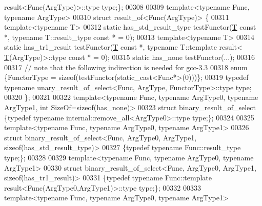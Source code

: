 \begin{DoxyCode}
      result<Func(ArgType)>::type type;\};
00308 
00309 \textcolor{keyword}{template}<\textcolor{keyword}{typename} Func, \textcolor{keyword}{typename} ArgType>
00310 \textcolor{keyword}{struct }result\_of<Func(ArgType)> \{
00311     \textcolor{keyword}{template}<\textcolor{keyword}{typename} T>
00312     \textcolor{keyword}{static} has\_std\_result\_type    testFunctor(\hyperlink{group___sparse_core___module_class_eigen_1_1_triplet}{T} \textcolor{keyword}{const} *, \textcolor{keyword}{typename} T::result\_type \textcolor{keyword}{const} * = 0);
00313     \textcolor{keyword}{template}<\textcolor{keyword}{typename} T>
00314     \textcolor{keyword}{static} has\_tr1\_result         testFunctor(\hyperlink{group___sparse_core___module_class_eigen_1_1_triplet}{T} \textcolor{keyword}{const} *, \textcolor{keyword}{typename} T::template result<
      \hyperlink{group___sparse_core___module_class_eigen_1_1_triplet}{T}(ArgType)>::type \textcolor{keyword}{const} * = 0);
00315     \textcolor{keyword}{static} has\_none               testFunctor(...);
00316 
00317     \textcolor{comment}{// note that the following indirection is needed for gcc-3.3}
00318     \textcolor{keyword}{enum} \{FunctorType = \textcolor{keyword}{sizeof}(testFunctor(static\_cast<Func*>(0)))\};
00319     \textcolor{keyword}{typedef} \textcolor{keyword}{typename} unary\_result\_of\_select<Func, ArgType, FunctorType>::type type;
00320 \};
00321 
00322 \textcolor{keyword}{template}<\textcolor{keyword}{typename} Func, \textcolor{keyword}{typename} ArgType0, \textcolor{keyword}{typename} ArgType1, \textcolor{keywordtype}{int} SizeOf=sizeof(has\_none)>
00323 \textcolor{keyword}{struct }binary\_result\_of\_select \{\textcolor{keyword}{typedef} \textcolor{keyword}{typename} internal::remove\_all<ArgType0>::type type;\};
00324 
00325 \textcolor{keyword}{template}<\textcolor{keyword}{typename} Func, \textcolor{keyword}{typename} ArgType0, \textcolor{keyword}{typename} ArgType1>
00326 \textcolor{keyword}{struct }binary\_result\_of\_select<Func, ArgType0, ArgType1, sizeof(has\_std\_result\_type)>
00327 \{\textcolor{keyword}{typedef} \textcolor{keyword}{typename} Func::result\_type type;\};
00328 
00329 \textcolor{keyword}{template}<\textcolor{keyword}{typename} Func, \textcolor{keyword}{typename} ArgType0, \textcolor{keyword}{typename} ArgType1>
00330 \textcolor{keyword}{struct }binary\_result\_of\_select<Func, ArgType0, ArgType1, sizeof(has\_tr1\_result)>
00331 \{\textcolor{keyword}{typedef} \textcolor{keyword}{typename} Func::template result<Func(ArgType0,ArgType1)>::type type;\};
00332 
00333 \textcolor{keyword}{template}<\textcolor{keyword}{typename} Func, \textcolor{keyword}{typename} ArgType0, \textcolor{keyword}{typename} ArgType1>

\end{DoxyCode}
